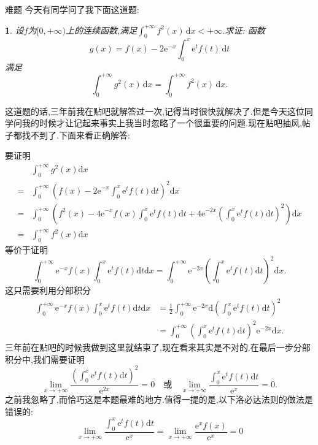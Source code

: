 \documentclass[UTF8,no-math,12pt,openany,table,dvipsnames,svgnames]{book}
\newcommand{\hei}{\CJKfamily{hei}}
\newenvironment{Proof}{\par\indent{\hei 证明}\hspace{1em}}{\par}
\newtheorem{example}{}
\begin{document}
\begin{MYBOX}[colbacktitle=blue]{难题}
今天有同学问了我下面这道题:
\begin{example}\normalfont
设$f$为$[0,+\infty)$上的连续函数,满足$\int_0^{+\infty}f^2(x)\,\mathrm dx<+\infty$.求证: 函数
\[g(x)=f(x)-2\mathrm e^{-x}\int_0^x\mathrm e^tf(t)\,\mathrm dt\]
满足
\[\int_0^{+\infty}g^2(x)\,\mathrm dx=\int_0^{+\infty}f^2(x)\,\mathrm dx.\]
\end{example}
\tcblower
这道题的话,三年前我在贴吧就解答过一次,记得当时很快就解决了.但是今天这位同学问我的时候才让记起来事实上我当时忽略了一个很重要的问题.现在贴吧抽风,帖子都找不到了.下面来看正确解答:
\begin{Proof}
要证明
\begin{align*}
{}&\int_0^{+\infty}{g^2\left( x \right) \text{d}x}
\\=&\int_0^{+\infty}{\left( f\left( x \right) -\text{2e}^{-x}\int_0^x{\text{e}^tf\left( t \right) \text{d}t} \right) ^2\text{d}x}\\
=&\int_0^{+\infty}{\left( f^2\left( x \right) -\text{4e}^{-x}f\left( x \right) \int_0^x{\text{e}^tf\left( t \right) \text{d}t}+\text{4e}^{-2x}\left( \int_0^x{\text{e}^tf\left( t \right) \text{d}t} \right) ^2 \right) \text{d}x}\\
=&\int_0^{+\infty}{f^2\left( x \right) \text{d}x}
\end{align*}
等价于证明\[
\int_0^{+\infty}{\text{e}^{-x}f\left( x \right) \int_0^x{\text{e}^tf\left( t \right) \text{d}t}\text{d}x}=\int_0^{+\infty}{\text{e}^{-2x}\left( \int_0^x{\text{e}^tf\left( t \right) \text{d}t} \right) ^2\text{d}x}.\]
这只需要利用分部积分
\begin{align*}
\int_0^{+\infty}{\text{e}^{-x}f\left( x \right) \int_0^x{\text{e}^tf\left( t \right) \text{d}t}\text{d}x}&=\frac{1}{2}\int_0^{+\infty}{\text{e}^{-2x}\text{d}\left( \int_0^x{\text{e}^tf\left( t \right) \text{d}t} \right) ^2}\\
&=\int_0^{+\infty}{\left( \int_0^x{\text{e}^tf\left( t \right) \text{d}t} \right) ^2\text{e}^{-2x}\text{d}x}.
\end{align*}
三年前在贴吧的时候我做到这里就结束了,现在看来其实是不对的.在最后一步分部积分中,我们需要证明
\[
\lim_{x\rightarrow +\infty} \frac{\left( \int_0^x{\text{e}^tf\left( t \right) \text{d}t} \right) ^2}{\text{e}^{2x}}=0\quad\text{或}\quad\lim_{x\rightarrow +\infty} \frac{\int_0^x{\text{e}^tf\left( t \right) \text{d}t}}{\text{e}^x}=0.
\]
之前我忽略了,而恰巧这是本题最难的地方.值得一提的是,以下洛必达法则的做法是错误的:
\[
\lim_{x\rightarrow +\infty} \frac{\int_0^x{\text{e}^tf\left( t \right) \text{d}t}}{\text{e}^x}=\lim_{x\rightarrow +\infty} \frac{\text{e}^xf\left( x \right)}{\text{e}^x}=0
\]
\end{Proof}
\end{MYBOX}
\end{document}
